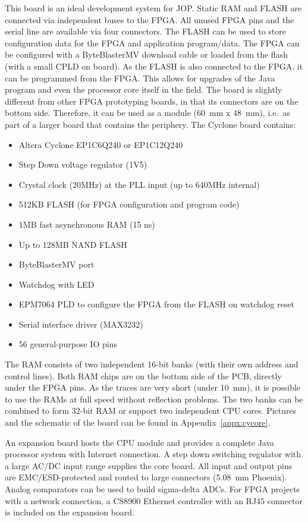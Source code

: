 This board is an ideal development system for JOP. Static RAM and
FLASH are connected via independent buses to the FPGA. All unused
FPGA pins and the serial line are available via four connectors. The
FLASH can be used to store configuration data for the FPGA and
application program/data. The FPGA can be configured with a
ByteBlasterMV download cable or loaded from the flash (with a small
CPLD on board). As the FLASH is also connected to the FPGA, it can
be programmed from the FPGA. This allows for upgrades of the Java
program and even the processor core itself in the field. The board
is slightly different from other FPGA prototyping boards, in that
its connectors are on the bottom side. Therefore, it can be used as
a module (60~mm x 48~mm), i.e.\ as part of a larger board that
contains the periphery. The Cyclone board contains:
%
\begin{itemize}
\item Altera Cyclone EP1C6Q240 or EP1C12Q240
\item Step Down voltage regulator (1V5)
\item Crystal clock (20MHz) at the PLL input (up to 640MHz internal)
\item 512KB FLASH (for FPGA configuration and program code)
\item 1MB fast asynchronous RAM (15 ns)
\item Up to 128MB NAND FLASH
\item ByteBlasterMV port
\item Watchdog with LED
\item EPM7064 PLD to configure the FPGA from the FLASH on watchdog reset
\item Serial interface driver (MAX3232)
\item 56 general-purpose IO pins
\end{itemize}
%
The RAM consists of two independent 16-bit banks (with their own
address and control lines). Both RAM chips are on the bottom side of
the PCB, directly under the FPGA pins. As the traces are very short
(under 10~mm), it is possible to use the RAMs at full speed without
reflection problems. The two banks can be combined to form 32-bit
RAM or support two independent CPU cores. Pictures and the schematic
of the board can be found in Appendix~\ref{appx:cycore}.

An expansion board hosts the CPU module and provides a complete Java
processor system with Internet connection. A step down switching
regulator with a large AC/DC input range supplies the core board.
All input and output pins are EMC/ESD-protected and routed to large
connectors (5.08~mm Phoenix). Analog comparators can be used to
build sigma-delta ADCs. For FPGA projects with a network connection,
a CS8900 Ethernet controller with an RJ45 connector is included on
the expansion board.

